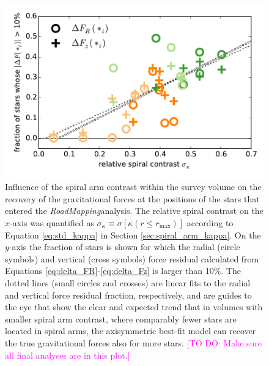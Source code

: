 \documentclass[iop,revtex4,numberedappendix,appendixfloats]{emulateapj}
\newcommand{\RM}{{\sl RoadMapping}}
\newcommand{\Wilma}[1]{\textcolor{Magenta}{#1}}
\begin{document}
\begin{figure}[!htbp]
\centering
\includegraphics[width=\columnwidth]{fig/MNdHHdiffSph2_plot_stdkappa_vs_frac10star_2.pdf}
\caption{Influence of the spiral arm contrast within the survey volume on the recovery of the gravitational forces at the positions of the stars that entered the \RM{analysis}. The relative spiral contrast on the $x$-axis was quantified as $\sigma_\kappa \equiv \sigma[\kappa(r\leq r_\text{max})]$ according to Equation \eqref{eq:std_kappa} in Section \ref{sec:spiral_arm_kappa}. On the $y$-axis the fraction of stars is shown for which the radial (circle symbols) and vertical (cross symbols) force residual calculated from Equations \eqref{eq:delta_FR}-\eqref{eq:delta_Fz} is larger than 10\%. The dotted lines (small circles and crosses) are linear fits to the radial and vertical force residual fraction, respectively, and are guides to the eye that show the clear and expected trend that in volumes with smaller spiral arm contrast, where comparably fewer stars are located in spiral arms, the axisymmetric best-fit model can recover the true gravitational forces also for more stars. \Wilma{[TO DO: Make sure all final analyses are in this plot.]}}
\label{fig:std_kappa_vs_frac10_stars}
\end{figure}
\end{document}
